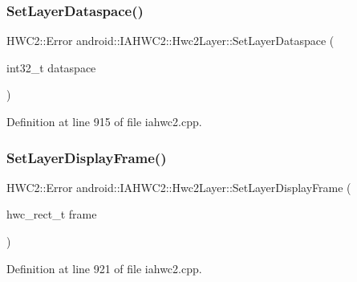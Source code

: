 \subsubsection{\texorpdfstring{Set\+Layer\+Dataspace()}{SetLayerDataspace()}}
{\footnotesize\ttfamily H\+W\+C2\+::\+Error android\+::\+I\+A\+H\+W\+C2\+::\+Hwc2\+Layer\+::\+Set\+Layer\+Dataspace (\begin{DoxyParamCaption}\item[{int32\+\_\+t}]{dataspace }\end{DoxyParamCaption})}



Definition at line 915 of file iahwc2.\+cpp.


\begin{DoxyCode}{0}
\end{DoxyCode}
\mbox{\label{classandroid_1_1IAHWC2_1_1Hwc2Layer_a224e34e2bfd8844cc884b940a43440d4}} 
\subsubsection{\texorpdfstring{Set\+Layer\+Display\+Frame()}{SetLayerDisplayFrame()}}
{\footnotesize\ttfamily H\+W\+C2\+::\+Error android\+::\+I\+A\+H\+W\+C2\+::\+Hwc2\+Layer\+::\+Set\+Layer\+Display\+Frame (\begin{DoxyParamCaption}\item[{hwc\+\_\+rect\+\_\+t}]{frame }\end{DoxyParamCaption})}



Definition at line 921 of file iahwc2.\+cpp.


